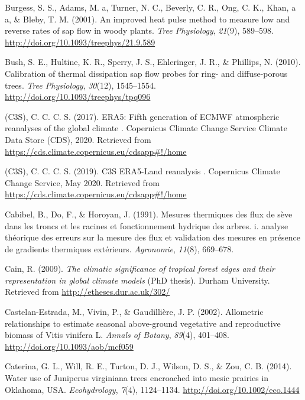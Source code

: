 \documentclass[11pt,twoside]{reedthesis}
\begin{document}
\hypertarget{ref-Burgess2001}{}
Burgess, S. S., Adams, M. a, Turner, N. C., Beverly, C. R., Ong, C. K.,
Khan, a a, \& Bleby, T. M. (2001). An improved heat pulse method to
measure low and reverse rates of sap flow in woody plants. \emph{Tree
Physiology}, \emph{21}(9), 589--598.
\url{http://doi.org/10.1093/treephys/21.9.589}

\hypertarget{ref-Bush2010}{}
Bush, S. E., Hultine, K. R., Sperry, J. S., Ehleringer, J. R., \&
Phillips, N. (2010). Calibration of thermal dissipation sap flow probes
for ring- and diffuse-porous trees. \emph{Tree Physiology},
\emph{30}(12), 1545--1554. \url{http://doi.org/10.1093/treephys/tpq096}

\hypertarget{ref-copernicus_climate_change_service_c3s_era5_2017}{}
(C3S), C. C. C. S. (2017). ERA5: Fifth generation of ECMWF atmospheric
reanalyses of the global climate . Copernicus Climate Change Service
Climate Data Store (CDS), 2020. Retrieved from
\url{https://cds.climate.copernicus.eu/cdsapp\#!/home}

\hypertarget{ref-copernicus_climate_change_service_c3s_c3s_2019}{}
(C3S), C. C. C. S. (2019). C3S ERA5-Land reanalysis . Copernicus Climate
Change Service, May 2020. Retrieved from
\url{https://cds.climate.copernicus.eu/cdsapp\#!/home}

\hypertarget{ref-Cabibel1991}{}
Cabibel, B., Do, F., \& Horoyan, J. (1991). Mesures thermiques des flux
de sève dans les troncs et les racines et fonctionnement hydrique des
arbres. i. analyse théorique des erreurs sur la mesure des flux et
validation des mesures en présence de gradients thermiques extérieurs.
\emph{Agronomie}, \emph{11}(8), 669--678.

\hypertarget{ref-Cain2009}{}
Cain, R. (2009). \emph{The climatic significance of tropical forest
edges and their representation in global climate models} (PhD thesis).
Durham University. Retrieved from \url{http://etheses.dur.ac.uk/302/}

\hypertarget{ref-Castelan-Estrada2002}{}
Castelan-Estrada, M., Vivin, P., \& Gaudillière, J. P. (2002).
Allometric relationships to estimate seasonal above-ground vegetative
and reproductive biomass of Vitis vinifera L. \emph{Annals of Botany},
\emph{89}(4), 401--408. \url{http://doi.org/10.1093/aob/mcf059}

\hypertarget{ref-Caterina2014}{}
Caterina, G. L., Will, R. E., Turton, D. J., Wilson, D. S., \& Zou, C.
B. (2014). Water use of Juniperus virginiana trees encroached into mesic
prairies in Oklahoma, USA. \emph{Ecohydrology}, \emph{7}(4), 1124--1134.
\url{http://doi.org/10.1002/eco.1444}
\end{document}
